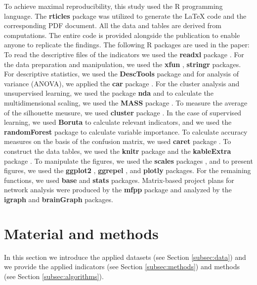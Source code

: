 \documentclass[preprint,
3p]{elsarticle} %
\begin{document}
To achieve maximal reproducibility, this study used the R programming
language. The \textbf{rticles} \citep{rticlespkg} package was utilized
to generate the LaTeX code and the corresponding PDF document. All the
data and tables are derived from computations. The entire code is
provided alongside the publication to enable anyone to replicate the
findings. The following R packages are used in the paper: To read the
descriptive files of the indicators we used the \textbf{readxl} package
\citep{readxlpkg}. For the data preparation and manipulation, we used
the \textbf{xfun} \citep{xfunpkg}, \textbf{stringr} \citep{stringrpkg}
packages. For descriptive statistics, we used the \textbf{DescTools}
package \citep{DescToolspkg} and for analysis of variance (ANOVA), we
applied the \textbf{car} package \citep{carpkg}. For the cluster
analysis and unsupervised learning, we used the package \textbf{nda}
\citep{kosztyan2023network} and to calculate the multidimensional
scaling, we used the \textbf{MASS} package \citep{MASSpkg}. To measure
the average of the silhouette meusure, we used \textbf{cluster} package
\citep{clusterpkg}. In the case of supervised learning, we used
\textbf{Boruta} \citep{Borutapkg} to calculate relevant indicators, and
we used the \textbf{randomForest} package \citep{randomForestpkg} to
calculate variable importance. To calculate accuracy measures on the
basis of the confusion matrix, we used \textbf{caret} package
\citep{caretpkg}. To construct the data tables, we used the
\textbf{knitr} package \citep{knitrpkg} and the \textbf{kableExtra}
package \citep{kableExtrapkg}. To manipulate the figures, we used the
\textbf{scales} packages \citep{scalespkg}, and to present figures, we
used the \textbf{ggplot2} \citep{ggplot2pkg}, \textbf{ggrepel}
\citep{ggrepelpkg}, and \textbf{plotly} \citep{plotlypkg} packages. For
the remaining functions, we used \textbf{base} \citep{basepkg} and
\textbf{stats} \citep{statspkg} packages. Matrix-based project plans for
network analysis were produced by the \textbf{mfpp} \citep{mfpppkg}
package and analyzed by the \textbf{igraph} \citep{igraphpkg} and
\textbf{brainGraph} \citep{braingraphpkg} packages.

\section{Material and methods}\label{sec:methods}

In this section we introduce the applied datasets (see Section
\ref{subsec:data}) and we provide the applied indicators (see Section
\ref{subsec:methods}) and methods (see Section \ref{subsec:algorithms}).
\end{document}
